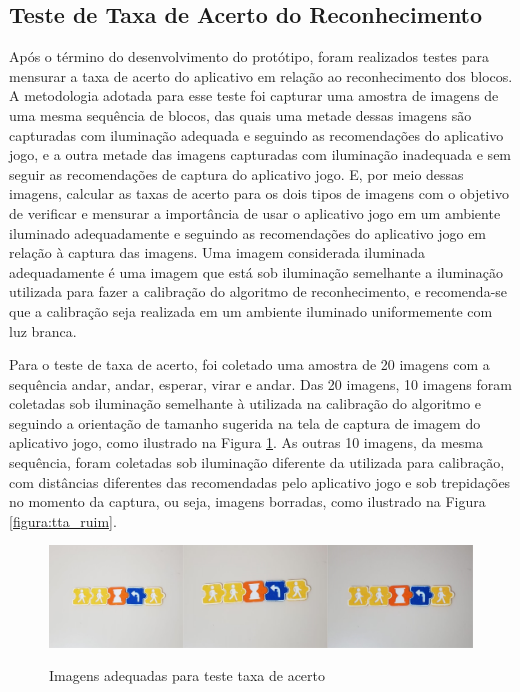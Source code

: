 \subsection{\textbf{Teste de Taxa de Acerto do Reconhecimento}}

Após o término do desenvolvimento do protótipo, foram realizados testes para mensurar a taxa de acerto do aplicativo em relação ao reconhecimento dos blocos. A metodologia adotada para esse teste foi capturar uma amostra de imagens de uma mesma sequência de blocos, das quais uma metade dessas imagens são capturadas com iluminação adequada e seguindo as recomendações do aplicativo jogo, e a outra metade das imagens capturadas com iluminação inadequada e sem seguir as recomendações de captura do aplicativo jogo. E, por meio dessas imagens, calcular as taxas de acerto para os dois tipos de imagens com o objetivo de verificar e mensurar a importância de usar o aplicativo jogo em um ambiente iluminado adequadamente e seguindo as recomendações do aplicativo jogo em relação à captura das imagens. Uma imagem considerada iluminada adequadamente é uma imagem que está sob  iluminação semelhante a iluminação utilizada para fazer a calibração do algoritmo de reconhecimento, e recomenda-se que a calibração seja realizada em um ambiente iluminado uniformemente com luz branca. 

Para o teste de taxa de acerto, foi coletado uma amostra de 20 imagens com a sequência andar, andar, esperar, virar e andar. Das 20 imagens, 10 imagens foram coletadas sob iluminação semelhante à utilizada na calibração do algoritmo e seguindo a orientação de tamanho sugerida na tela de captura de imagem do aplicativo jogo, como ilustrado na Figura \ref{figura:tta_boa}. As outras 10 imagens, da mesma sequência, foram coletadas sob iluminação diferente da utilizada para calibração, com distâncias diferentes das recomendadas pelo aplicativo jogo e sob trepidações no momento da captura, ou seja, imagens borradas, como ilustrado na Figura \ref{figura:tta_ruim}.

\begin{figure}[H]
    \caption{Imagens adequadas para teste taxa de acerto}
    \centering
    \includegraphics[width=15cm]{Imagens/Cap5/tta_boa.PNG}
    \label{figura:tta_boa}
\end{figure}

